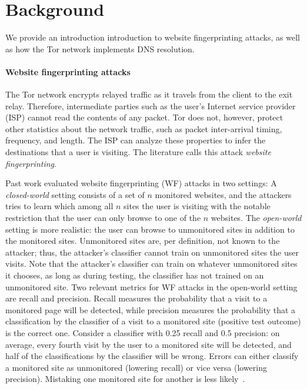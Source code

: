 \section{Background}
\label{sec:background}
We provide an introduction introduction to website fingerprinting
attacks, as well as how
the Tor network implements DNS resolution.

\paragraph{Website fingerprinting attacks}
The Tor network encrypts relayed traffic as it travels from the client
to the exit relay.  Therefore, intermediate parties such as the user's
Internet service provider (ISP) cannot read the contents of any packet.
Tor does not, however, protect other statistics about the network
traffic, such as packet inter-arrival timing, frequency, and length.
The ISP can analyze these properties to infer the destinations that a
user is visiting.  The literature calls this attack \emph{website
  fingerprinting}.

Past work evaluated website fingerprinting (WF) attacks in two settings:
A {\em closed-world} setting consists of a set of $n$ {monitored}
websites, and the attackers tries to learn which among all $n$ sites the
user is visiting with the notable restriction that the user can only
browse to one of the $n$ websites.  The {\em open-world} setting is more
realistic: the user can browse to {unmonitored} sites in addition to the
monitored sites. Unmonitored sites are, per definition, not known to the
attacker; thus, the attacker's classifier cannot train on unmonitored
sites the user visits. Note that the attacker's classifier can train on
whatever unmonitored sites it chooses, as long as during testing, the
classifier has not trained on an unmonitored site. Two relevant metrics
for WF attacks in the open-world
setting are recall and precision.  Recall measures the probability that
a visit to a monitored page will be detected, while precision measures
the probability that a classification by the classifier of a visit to a
monitored site (positive test outcome) is the correct one. Consider a
classifier with 0.25 recall and 0.5 precision: on average, every fourth
visit by the user to a monitored site will be detected, and half of the
classifications by the classifier will be wrong. Errors can
either classify a monitored site as
unmonitored (lowering recall) or vice versa (lowering precision).
Mistaking one monitored site for another is less
likely~\cite{WangThesis}.

